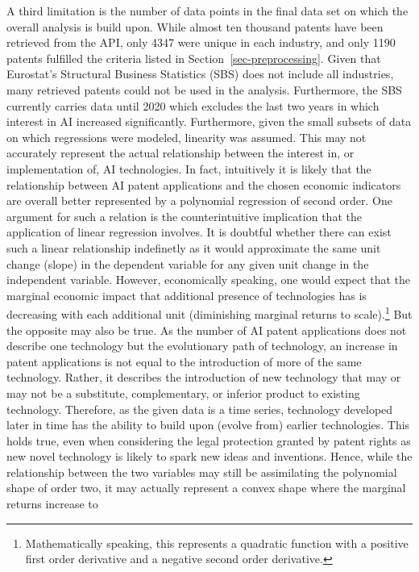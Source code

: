 \documentclass[
  12pt,
  a4paperpaper,
]{article}
\begin{document}
A third limitation is the number of data points in the final data set on
which the overall analysis is build upon. While almost ten thousand
patents have been retrieved from the API, only 4347 were unique in each
industry, and only 1190 patents fulfilled the criteria listed in
 Section~\ref{sec-preprocessing}. Given that
Eurostat's Structural Business Statistics (SBS) does not include all
industries, many retrieved patents could not be used in the analysis.
Furthermore, the SBS currently carries data until 2020 which excludes
the last two years in which interest in AI increased significantly.
Furthermore, given the small subsets of data on which regressions were
modeled, linearity was assumed. This may not accurately represent the
actual relationship between the interest in, or implementation of, AI
technologies. In fact, intuitively it is likely that the relationship
between AI patent applications and the chosen economic indicators are
overall better represented by a polynomial regression of second order.
One argument for such a relation is the counterintuitive implication
that the application of linear regression involves. It is doubtful
whether there can exist such a linear relationship indefinetly as it
would approximate the same unit change (slope) in the dependent variable
for any given unit change in the independent variable. However,
economically speaking, one would expect that the marginal economic
impact that additional presence of technologies has is decreasing with
each additional unit (diminishing marginal returns to scale).\footnote{Mathematically
  speaking, this represents a quadratic function with a positive first
  order derivative and a negative second order derivative.} But the
opposite may also be true. As the number of AI patent applications does
not describe one technology but the evolutionary path of technology, an
increase in patent applications is not equal to the introduction of more
of the same technology. Rather, it describes the introduction of new
technology that may or may not be a substitute, complementary, or
inferior product to existing technology. Therefore, as the given data is
a time series, technology developed later in time has the ability to
build upon (evolve from) earlier technologies. This holds true, even
when considering the legal protection granted by patent rights as new
novel technology is likely to spark new ideas and inventions. Hence,
while the relationship between the two variables may still be
assimilating the polynomial shape of order two, it may actually
represent a convex shape where the marginal returns increase to
\end{document}
